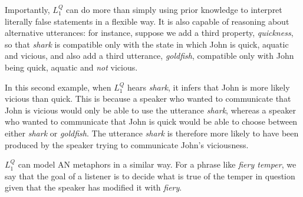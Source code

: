 \documentclass[9pt,twocolumn,twoside,lineno]{pnas-new}
\newcommand{\Listener}{L}
\newcommand{\QLONE}{\Listener_{{1}}^{{Q}}}
\begin{document}
	Importantly, $\QLONE$ can do more than simply using prior knowledge to interpret literally false statements in a flexible way. It is also capable of reasoning about alternative utterances: for instance, suppose we add a third property, \emph{quickness}, so that \emph{shark} is compatible only with the state in which John is quick, aquatic and vicious, and also add a third utterance, \emph{goldfish}, compatible only with John being quick, aquatic and \emph{not} vicious.

	
	In this second example, when $\QLONE$ hears \emph{shark}, it infers that John is more likely vicious than quick. This is because a speaker who wanted to communicate that John is vicious would only be able to use the utterance \emph{shark}, whereas a speaker who wanted to communicate that John is quick would be able to choose between either \emph{shark} or \emph{goldfish}. The utterance \emph{shark} is therefore more likely to have been produced by the speaker trying to communicate John's viciousness.

	



	$\QLONE$ can model AN metaphors in a similar way. For a phrase like \emph{fiery temper}, we say that the goal of a listener is to decide what is true of the temper in question given that the speaker has modified it with \emph{fiery}.

\end{document}
